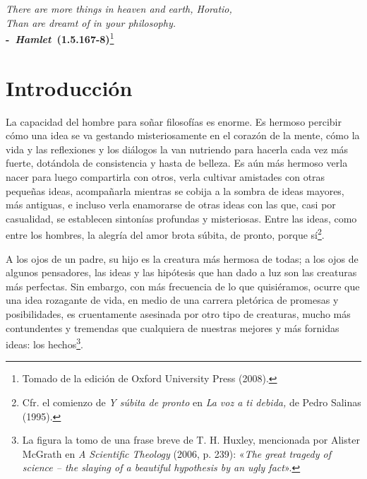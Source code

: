 
\begin{refsection}

\begin{flushright}
	\emph{There are more things in heaven and earth, Horatio,\\
		Than are dreamt of in your philosophy.}\\
	\textbf{-~\emph{Hamlet}~(1.5.167-8)}\footnote{Tomado de la edición de Oxford University Press (2008).}
\end{flushright}



\section*{Introducción}

La capacidad del hombre para soñar filosofías es enorme. Es hermoso percibir cómo una idea se va gestando misteriosamente en el corazón de la mente, cómo la vida y las reflexiones y los diálogos la van nutriendo para hacerla cada vez más fuerte, dotándola de consistencia y hasta de belleza. Es aún más hermoso verla nacer para luego compartirla con otros, verla cultivar amistades con otras pequeñas ideas, acompañarla mientras se cobija a la sombra de ideas mayores, más antiguas, e incluso verla enamorarse de otras ideas con las que, casi por casualidad, se establecen sintonías profundas y misteriosas. Entre las ideas, como entre los hombres, la alegría del amor brota súbita, de pronto, porque sí\footnote{Cfr. el comienzo de \emph{Y súbita de pronto} en \emph{La voz a ti debida,} de Pedro Salinas (1995).}.

A los ojos de un padre, su hijo es la creatura más hermosa de todas; a los ojos de algunos pensadores, las ideas y las hipótesis que han dado a luz son las creaturas más perfectas. Sin embargo, con más frecuencia de lo que quisiéramos, ocurre que una idea rozagante de vida, en medio de una carrera pletórica de promesas y posibilidades, es cruentamente asesinada por otro tipo de creaturas, mucho más contundentes y tremendas que cualquiera de nuestras mejores y más fornidas ideas: los hechos\footnote{La figura la tomo de una frase breve de T. H. Huxley, mencionada por Alister McGrath en \emph{A Scientific Theology} (2006, p. 239): «\emph{The great tragedy of science -- the slaying of a beautiful hypothesis by an ugly fact}».}.


\end{refsection}
